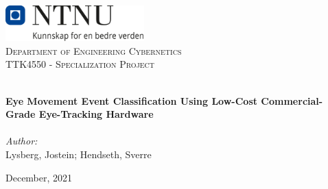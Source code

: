 
\begin{titlepage}
\vbox{ }
\vbox{ }
\begin{center}
\includegraphics[width=0.40\textwidth]{Images/NTNU_logo.png}\\[1cm]
\textsc{\LARGE Department of Engineering Cybernetics}\\[1.5cm]
\textsc{\Large TTK4550 - Specialization Project}\\[0.5cm]
\vbox{ }

\HRule \\[0.4cm]
{ \huge \bfseries Eye Movement Event Classification Using Low-Cost Commercial-Grade Eye-Tracking Hardware}\\[0.4cm]
\HRule \\[1.5cm]

\large
\emph{Author:}\\
Lysberg, Jostein; Hendseth, Sverre
\vfill

{\large December, 2021}
\end{center}
\end{titlepage}